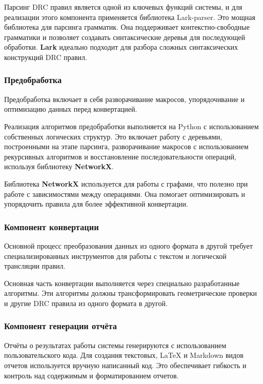 Парсинг DRC правил является одной из ключевых функций системы,
и для реализации этого компонента применяется библиотека Lark-parser.
Это мощная библиотека для парсинга грамматик.
Она поддерживает контекстно-свободные грамматики
и позволяет создавать синтаксические деревья для последующей обработки.
\textbf{Lark} идеально подходит для разбора
сложных синтаксических конструкций DRC правил.

\subsubsection{Предобработка}

Предобработка включает в себя разворачивание макросов,
упорядочивание и оптимизацию данных перед конвертацией.\par
Реализация алгоритмов предобработки выполняется на Python
с использованием собственных логических структур.
Это включает работу с деревьями, построенными на этапе парсинга,
разворачивание макросов с использованием рекурсивных алгоритмов
и восстановление последовательности операций,
используя библиотеку \textbf{NetworkX}.\par
Библиотека \textbf{NetworkX} используется для работы с графами,
что полезно при работе с зависимостями между операциями.
Она помогает оптимизировать и упорядочить правила
для более эффективной конвертации.

\subsubsection{Компонент конвертации}

Основной процесс преобразования данных из одного формата в другой
требует специализированных инструментов
для работы с текстом и логической трансляции правил.\par
Основная часть конвертации выполняется
через специально разработанные алгоритмы.
Эти алгоритмы должны трансформировать геометрические проверки
и другие DRC правила из одного формата в другой.

\subsubsection{Компонент генерации отчёта}

Отчёты о результатах работы системы генерируются
с использованием пользовательского кода.
Для создания текстовых, LaTeX и Markdown видов отчетов используется
вручную написанный код.
Это обеспечивает гибкость и контроль над содержимым и форматированием отчетов.

